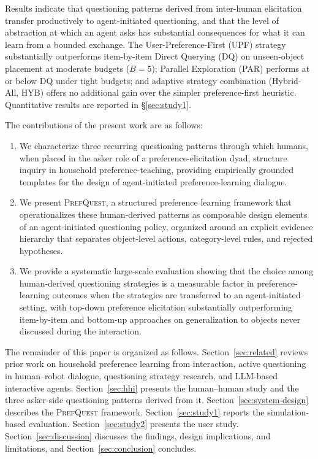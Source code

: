 \documentclass[manuscript,review,anonymous]{acmart}
\begin{document}
Results indicate that questioning patterns derived from inter-human elicitation transfer productively to agent-initiated questioning, and that the level of abstraction at which an agent asks has substantial consequences for what it can learn from a bounded exchange. The User-Preference-First (UPF) strategy substantially outperforms item-by-item Direct Querying (DQ) on unseen-object placement at moderate budgets ($B = 5$); Parallel Exploration (PAR) performs at or below DQ under tight budgets; and adaptive strategy combination (Hybrid-All, HYB) offers no additional gain over the simpler preference-first heuristic. Quantitative results are reported in §\ref{sec:study1}.

The contributions of the present work are as follows:
\begin{enumerate}
  \item We characterize three recurring questioning patterns through which humans, when placed in the asker role of a preference-elicitation dyad, structure inquiry in household preference-teaching, providing empirically grounded templates for the design of agent-initiated preference-learning dialogue.
  \item We present \textsc{PrefQuest}, a structured preference learning framework that operationalizes these human-derived patterns as composable design elements of an agent-initiated questioning policy, organized around an explicit evidence hierarchy that separates object-level actions, category-level rules, and rejected hypotheses.
  \item We provide a systematic large-scale evaluation showing that the choice among human-derived questioning strategies is a measurable factor in preference-learning outcomes when the strategies are transferred to an agent-initiated setting, with top-down preference elicitation substantially outperforming item-by-item and bottom-up approaches on generalization to objects never discussed during the interaction.
\end{enumerate}

The remainder of this paper is organized as follows. Section~\ref{sec:related} reviews prior work on household preference learning from interaction, active questioning in human--robot dialogue, questioning strategy research, and LLM-based interactive agents. Section~\ref{sec:hhi} presents the human--human study and the three asker-side questioning patterns derived from it. Section~\ref{sec:system-design} describes the \textsc{PrefQuest} framework. Section~\ref{sec:study1} reports the simulation-based evaluation. Section~\ref{sec:study2} presents the user study. Section~\ref{sec:discussion} discusses the findings, design implications, and limitations, and Section~\ref{sec:conclusion} concludes.
\end{document}
